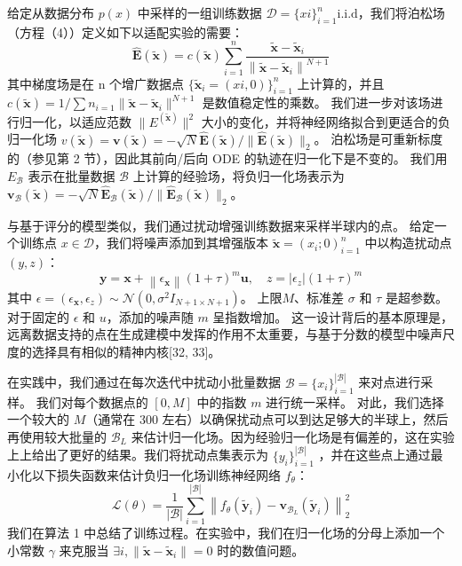 \documentclass[hyperref,UTF-8]{ctexart}
\newcommand{\0}{\boldsymbol{0}}
\begin{document}
给定从数据分布 $p(x)$ 中采样的一组训练数据 $\mathcal{D} = \{xi\}_{i=1}^n \text{i.i.d}$，我们将泊松场（方程（4））定义如下以适配实验的需要：
\[
  \hat{\mathbf{E}}(\tilde{\mathbf{x}})=c(\tilde{\mathbf{x}}) \sum_{i=1}^n \frac{\tilde{\mathbf{x}}-\tilde{\mathbf{x}}_i}{\left\|\tilde{\mathbf{x}}-\tilde{\mathbf{x}}_i\right\|^{N+1}}
\]
其中梯度场是在 n 个增广数据点 $\{\tilde{\mathbf{x}}_i = (xi, 0)\}^n _{i=1}$ 上计算的，并且 $c(\tilde{\mathbf{x}}) =1/\sum n _{i=1} \|\tilde{\mathbf{x}}−\tilde{\mathbf{x}}_i \| ^{N+ 1}$ 是数值稳定性的乘数。 我们进一步对该场进行归一化，以适应范数 $\| E^(\tilde{\mathbf{x}})\|^2$ 大小的变化，并将神经网络拟合到更适合的负归一化场 $v(\tilde{\mathbf{x}}) = \mathbf{v}(\tilde{\mathbf{x}})=-\sqrt{N} \hat{\mathbf{E}}(\tilde{\mathbf{x}}) /\|\hat{\mathbf{E}}(\tilde{\mathbf{x}})\|_2$。 泊松场是可重新标度的（参见第 2 节），因此其前向/后向 ODE 的轨迹在归一化下是不变的。 我们用 $E_\mathcal{B}$ 表示在批量数据 $\mathcal{B}$ 上计算的经验场，将负归一化场表示为 $\mathbf{v}_{\mathcal{B}}(\tilde{\mathbf{x}})=-\sqrt{N} \hat{\mathbf{E}}_{\mathcal{B}}(\tilde{\mathbf{x}}) /\|\hat{\mathbf{E}}_{\mathcal{B}}(\tilde{\mathbf{x}})\|_2$。

与基于评分的模型类似，我们通过扰动增强训练数据来采样半球内的点。 给定一个训练点 $x ∈ \mathcal D$，我们将噪声添加到其增强版本 ${\tilde{\mathbf{x}} = (x_i; 0)}^n_{i=1}$ 中以构造扰动点 $(y, z)$：
\begin{equation}
  \mathbf{y}=\mathbf{x}+\left\|\epsilon_{\mathbf{x}}\right\|(1+\tau)^m \mathbf{u}, \quad z=\left|\epsilon_z\right|(1+\tau)^m
\end{equation}
其中 $\epsilon=\left(\epsilon_{\mathbf{x}}, \epsilon_z\right) \sim \mathcal{N}\left(0, \sigma^2 I_{N+1 \times N+1}\right)$。 上限$M$、标准差 $\sigma$ 和 $\tau$ 是超参数。 对于固定的 $\epsilon$ 和 $u$，添加的噪声随 $m$ 呈指数增加。 这一设计背后的基本原理是，远离数据支持的点在生成建模中发挥的作用不太重要，与基于分数的模型中噪声尺度的选择具有相似的精神内核[32, 33]。

在实践中，我们通过在每次迭代中扰动小批量数据 $\mathcal{B} = \{x_i\}_{i = 1}^{|\mathcal{B}|}$ 来对点进行采样。 我们对每个数据点的 $[0,M]$ 中的指数 $m$ 进行统一采样。 对此，我们选择一个较大的 $M$（通常在 300 左右）以确保扰动点可以到达足够大的半球上，然后再使用较大批量的 $\mathcal B _L$ 来估计归一化场。因为经验归一化场是有偏差的，这在实验上上给出了更好的结果。我们将扰动点集表示为 $\{y_i\}_{i = 1}^{|\mathcal{B}|}$ ，并在这些点上通过最小化以下损失函数来估计负归一化场训练神经网络 $f_\theta$：
\[
  \mathcal{L}(\theta)=\frac{1}{|\mathcal{B}|} \sum_{i=1}^{|\mathcal{B}|}\left\|f_\theta\left(\tilde{\mathbf{y}}_i\right)-\mathbf{v}_{\mathcal{B}_L}\left(\tilde{\mathbf{y}}_i\right)\right\|_2^2
\]
我们在算法 1 中总结了训练过程。在实验中，我们在归一化场的分母上添加一个小常数 $\gamma$ 来克服当 $\exists i, \| \tilde{\mathbf{x}} − \tilde{\mathbf{x}}_i \| = 0$ 时的数值问题。
\end{document}
